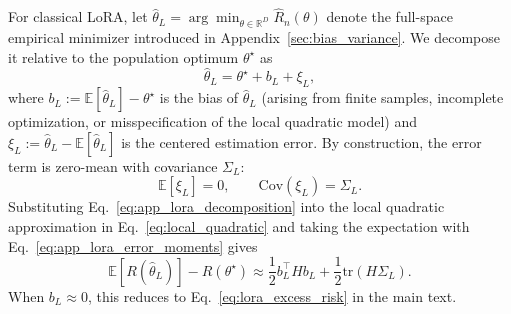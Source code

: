 For classical LoRA, let
$\hat{\theta}_L=\arg\min_{\theta\in\mathbb{R}^D}\widehat R_n(\theta)$
denote the full-space empirical minimizer introduced in Appendix~\ref{sec:bias_variance}.
We decompose it relative to the population optimum $\theta^\star$ as
\begin{equation}
\hat{\theta}_{L}
=
\theta^\star+b_L+\xi_L,
\label{eq:app_lora_decomposition}
\end{equation}
where
$b_L:=\mathbb{E}[\hat{\theta}_L]-\theta^\star$
is the bias of $\hat{\theta}_L$ (arising from finite samples, incomplete optimization, or misspecification of the local quadratic model) and
$\xi_L:=\hat{\theta}_L-\mathbb{E}[\hat{\theta}_L]$
is the centered estimation error.
By construction, the error term is zero-mean with covariance $\Sigma_L$:
\begin{equation}
\mathbb{E}[\xi_L]=0,
\qquad
\mathrm{Cov}(\xi_L)=\Sigma_L.
\label{eq:app_lora_error_moments}
\end{equation}
Substituting Eq.~\eqref{eq:app_lora_decomposition} into the local quadratic approximation in Eq.~\eqref{eq:local_quadratic} and taking the expectation with Eq.~\eqref{eq:app_lora_error_moments} gives
\begin{equation}
\mathbb{E}[R(\hat{\theta}_{L})]-R(\theta^\star)
\approx
\frac{1}{2}b_L^\top Hb_L
+
\frac{1}{2}\mathrm{tr}(H\Sigma_L).
\label{eq:app_lora_excess_risk_general}
\end{equation}
When $b_L\approx 0$, this reduces to Eq.~\eqref{eq:lora_excess_risk} in the main text.

